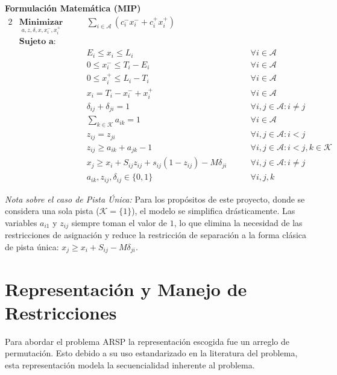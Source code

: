 \documentclass[letter, 10pt]{article}
\begin{document}
\noindent \textbf{Formulaci\'on Matem\'atica (MIP)}
\begin{alignat}{2}
& \underset{a,z,\delta,x,x_i^-,x_i^+}{\textbf{Minimizar}} \qquad & \sum_{i \in \mathcal{A}} (c_i^- x_i^- + c_i^+ x_i^+) & \label{eq:beasley_obj} \\
& \textbf{Sujeto a:} & \nonumber \\
& & E_i \leq x_i \leq L_i & \qquad \forall i \in \mathcal{A} \\
& & 0 \leq x_i^- \leq T_i - E_i & \qquad \forall i \in \mathcal{A} \\
& & 0 \leq x_i^+ \leq L_i - T_i & \qquad \forall i \in \mathcal{A} \\
& & x_i = T_i - x_i^- + x_i^+ & \qquad \forall i \in \mathcal{A} \\
& & \delta_{ij} + \delta_{ji} = 1 & \qquad \forall i, j \in \mathcal{A} : i \neq j \\
& & \sum_{k \in \mathcal{K}} a_{ik} = 1 & \qquad \forall i \in \mathcal{A} \\
& & z_{ij} = z_{ji} & \qquad \forall i, j \in \mathcal{A} : i < j \\
& & z_{ij} \geq a_{ik} + a_{jk} - 1 & \qquad \forall i, j \in \mathcal{A} : i < j, k \in \mathcal{K} \\
& & x_j \geq x_i + S_{ij}z_{ij} + s_{ij}(1 - z_{ij}) - M\delta_{ji} & \qquad \forall i, j \in \mathcal{A} : i \neq j \label{eq:beasley_sep} \\
& & a_{ik}, z_{ij}, \delta_{ij} \in \{0, 1\} & \qquad \forall i, j, k
\end{alignat}

\noindent \textit{Nota sobre el caso de Pista \'Unica:} Para los prop\'ositos de este proyecto, donde se considera una sola pista ($\mathcal{K} = \{1\}$), el modelo se simplifica dr\'asticamente. Las variables $a_{i1}$ y $z_{ij}$ siempre toman el valor de $1$, lo que elimina la necesidad de las restricciones de asignaci\'on y reduce la restricci\'on de separaci\'on \cite{beasley2000} a la forma cl\'asica de pista \'unica: $x_j \geq x_i + S_{ij} - M\delta_{ji}$.

\section{Representaci\'on y Manejo de Restricciones}
Para abordar el problema ARSP la representación escogida fue un arreglo de permutación. Esto debido a su uso estandarizado en la literatura del problema, esta representación modela la secuencialidad inherente al problema.
\end{document}

